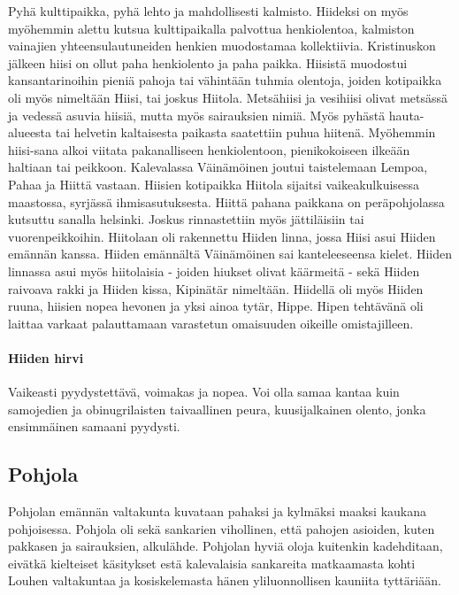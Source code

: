   Pyhä kulttipaikka, pyhä lehto ja mahdollisesti kalmisto. Hiideksi on myös myöhemmin alettu 
  kutsua kulttipaikalla palvottua henkiolentoa, kalmiston vainajien yhteensulautuneiden henkien 
  muodostamaa kollektiivia. Kristinuskon jälkeen hiisi on ollut paha henkiolento ja paha paikka. 
  Hiisistä muodostui kansantarinoihin pieniä pahoja tai vähintään tuhmia olentoja, joiden 
  kotipaikka oli myös nimeltään Hiisi, tai joskus Hiitola. Metsähiisi ja vesihiisi olivat 
  metsässä ja vedessä asuvia hiisiä, mutta myös sairauksien nimiä. Myös pyhästä hauta-alueesta 
  tai helvetin kaltaisesta paikasta saatettiin puhua hiitenä. Myöhemmin hiisi-sana alkoi viitata 
  pakanalliseen henkiolentoon, pienikokoiseen ilkeään haltiaan tai peikkoon. Kalevalassa 
  Väinämöinen joutui taistelemaan Lempoa, Pahaa ja Hiittä vastaan. Hiisien kotipaikka Hiitola 
  sijaitsi vaikeakulkuisessa maastossa, syrjässä ihmisasutuksesta. Hiittä pahana paikkana on 
  peräpohjolassa kutsuttu sanalla helsinki. Joskus rinnastettiin myös jättiläisiin tai 
  vuorenpeikkoihin. Hiitolaan oli rakennettu Hiiden linna, jossa Hiisi asui Hiiden emännän 
  kanssa. Hiiden emännältä Väinämöinen sai kanteleeseensa kielet. Hiiden linnassa asui myös 
  hiitolaisia - joiden hiukset olivat käärmeitä - sekä Hiiden raivoava rakki ja Hiiden kissa, 
  Kipinätär nimeltään. Hiidellä oli myös Hiiden ruuna, hiisien nopea hevonen ja yksi ainoa 
  tytär, Hippe. Hipen tehtävänä oli laittaa varkaat palauttamaan varastetun omaisuuden oikeille 
  omistajilleen. 
  
  \paragraph{Hiiden hirvi} Vaikeasti pyydystettävä, voimakas ja nopea. Voi olla samaa kantaa 
    kuin samojedien ja obinugrilaisten taivaallinen peura, kuusijalkainen olento, jonka 
    ensimmäinen samaani pyydysti. 



\subsection{Pohjola}
  Pohjolan emännän valtakunta kuvataan pahaksi ja kylmäksi maaksi kaukana pohjoisessa. Pohjola 
  oli sekä sankarien vihollinen, että pahojen asioiden, kuten pakkasen ja sairauksien, alkulähde. 
  Pohjolan hyviä oloja kuitenkin kadehditaan, eivätkä kielteiset käsitykset estä kalevalaisia 
  sankareita matkaamasta kohti Louhen valtakuntaa ja kosiskelemasta hänen yliluonnollisen 
  kauniita tyttäriään.
  
